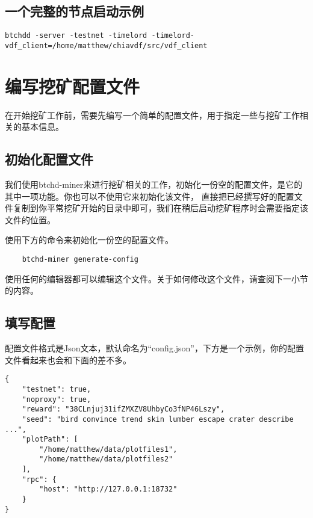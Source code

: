 \subsection{一个完整的节点启动示例}
\scriptsize
\begin{verbatim}
btchdd -server -testnet -timelord -timelord-vdf_client=/home/matthew/chiavdf/src/vdf_client
\end{verbatim}
\normalsize
\section{编写挖矿配置文件}
\begin{flushleft}
    在开始挖矿工作前，需要先编写一个简单的配置文件，用于指定一些与挖矿工作相关的基本信息。
\end{flushleft}
\subsection{初始化配置文件}
\begin{flushleft}
    我们使用btchd-miner来进行挖矿相关的工作，初始化一份空的配置文件，是它的其中一项功能。你也可以不使用它来初始化该文件，
    直接把已经撰写好的配置文件复制到你平常挖矿开始的目录中即可，我们在稍后启动挖矿程序时会需要指定该文件的位置。
\end{flushleft}
\begin{flushleft}
    使用下方的命令来初始化一份空的配置文件。
\end{flushleft}
\scriptsize
\begin{verbatim}
    btchd-miner generate-config
\end{verbatim}
\normalsize
\begin{flushleft}
    使用任何的编辑器都可以编辑这个文件。关于如何修改这个文件，请查阅下一小节的内容。
\end{flushleft}
\subsection{填写配置}
\begin{flushleft}
    配置文件格式是Json文本，默认命名为``config.json''，下方是一个示例，你的配置文件看起来也会和下面的差不多。
\end{flushleft}
\scriptsize
\begin{verbatim}
{
    "testnet": true,
    "noproxy": true,
    "reward": "38CLnjuj31ifZMXZV8UhbyCo3fNP46Lszy",
    "seed": "bird convince trend skin lumber escape crater describe ...",
    "plotPath": [
        "/home/matthew/data/plotfiles1",
        "/home/matthew/data/plotfiles2"
    ],
    "rpc": {
        "host": "http://127.0.0.1:18732"
    }
}
\end{verbatim}
\normalsize
